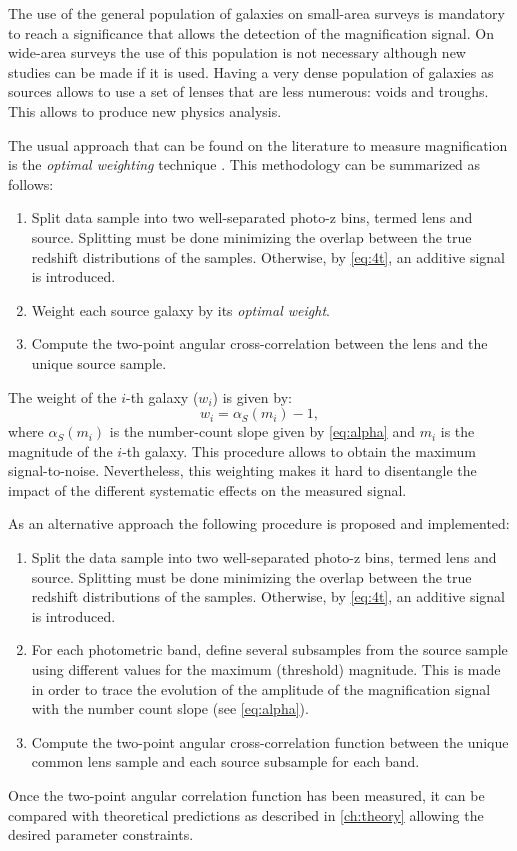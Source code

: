 The use of the general population of galaxies on small-area surveys is mandatory to reach a significance that allows the detection of the magnification signal. On wide-area surveys the use of this population is not necessary although new studies can be made if it is used. Having a very dense population of galaxies as sources allows to use a set of lenses that are less numerous: voids and troughs. This allows to produce new physics analysis.
\newline

The usual approach that can be found on the literature to measure magnification is the {\it optimal weighting} technique \cite{2003A&A...403..817M}. This methodology can be summarized as follows:
\begin{enumerate}
\item Split data sample into two well-separated photo-z bins, termed lens and source. Splitting must be done minimizing the overlap between the true redshift distributions of the samples. Otherwise, by \autoref{eq:4t}, an additive signal is introduced.
\item Weight each source galaxy by its {\it optimal weight}.
\item Compute the two-point angular cross-correlation between the lens and the unique source sample.
\end{enumerate}
The weight of the $i$-th galaxy ($w_i$) is given by:
\begin{equation}
w_i = \alpha_S(m_i)-1,
\end{equation}
where $\alpha_S(m_i)$ is the number-count slope given by \autoref{eq:alpha} and $m_i$ is the magnitude of the $i$-th galaxy. This procedure allows to obtain the maximum signal-to-noise. Nevertheless, this weighting makes it hard to disentangle the impact of the different systematic effects on the measured signal.
\newline

As an alternative approach the following procedure is proposed and implemented:
\begin{enumerate}
	\item Split the data sample into two well-separated photo-z bins, termed lens and source. Splitting must be done minimizing the overlap between the true redshift distributions of the samples. Otherwise, by \autoref{eq:4t}, an additive signal is introduced.
	\item For each photometric band, define several subsamples from the source sample using different values for the maximum (threshold) magnitude. This is made in order to trace the evolution of the amplitude of the magnification signal with the number count slope (see \autoref{eq:alpha}).
	\item Compute the two-point angular cross-correlation function between the unique common lens sample and each source subsample for each band.
\end{enumerate}
Once the two-point angular correlation function has been measured, it can be compared with theoretical predictions as described in \autoref{ch:theory} allowing the desired parameter constraints.
\newline

